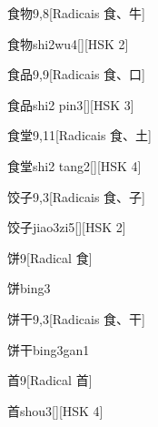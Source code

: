 \begin{entry}{食物}{9,8}[Radicais ⾷、⽜]
  \begin{phonetics}{食物}{shi2wu4}[][HSK 2]
  \end{phonetics}
\end{entry}

\begin{entry}{食品}{9,9}[Radicais ⾷、⼝]
  \begin{phonetics}{食品}{shi2 pin3}[][HSK 3]
  \end{phonetics}
\end{entry}

\begin{entry}{食堂}{9,11}[Radicais ⾷、⼟]
  \begin{phonetics}{食堂}{shi2 tang2}[][HSK 4]
  \end{phonetics}
\end{entry}

\begin{entry}{饺子}{9,3}[Radicais ⾷、⼦]
  \begin{phonetics}{饺子}{jiao3zi5}[][HSK 2]
  \end{phonetics}
\end{entry}

\begin{entry}{饼}{9}[Radical ⾷]
  \begin{phonetics}{饼}{bing3}
  \end{phonetics}
\end{entry}

\begin{entry}{饼干}{9,3}[Radicais ⾷、⼲]
  \begin{phonetics}{饼干}{bing3gan1}
  \end{phonetics}
\end{entry}

\begin{entry}{首}{9}[Radical ⾸]
  \begin{phonetics}{首}{shou3}[][HSK 4]
  \end{phonetics}
\end{entry}

